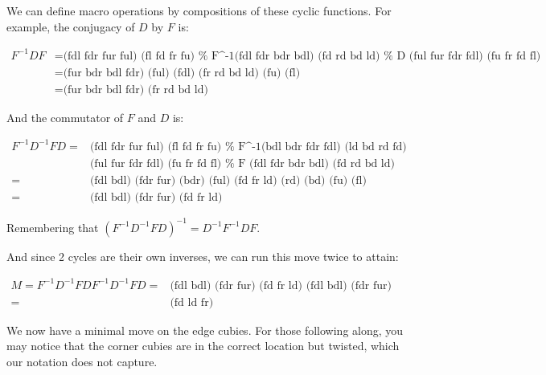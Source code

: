We can define macro operations by compositions of these cyclic
functions.  For example, the conjugacy of $D$ by $F$ is:

\begin{align*}
  F^{-1}DF 
  &= \text{(fdl fdr fur ful) (fl fd fr fu)     %
           (fdl fdr bdr bdl) (fd rd bd ld)     %
           (ful fur fdr fdl) (fu fr fd fl)} \\ %
  &= \text{(fur bdr bdl fdr) (ful) (fdl) (fr rd bd ld) (fu) (fl)} \\
  &= \text{(fur bdr bdl fdr) (fr rd bd ld)}
\end{align*}
  
And the commutator of $F$ and $D$ is:

\begin{align*}
  F^{-1}D^{-1}FD
  = &\text{(fdl fdr fur ful) (fl fd fr fu)     %
           (bdl bdr fdr fdl) (ld bd rd fd)} \\ %
    &\text{(ful fur fdr fdl) (fu fr fd fl)     %
           (fdl fdr bdr bdl) (fd rd bd ld)} \\ %
  = &\text{(fdl bdl) (fdr fur) (bdr) (ful) (fd fr ld) (rd) (bd) (fu) (fl)} \\
  = &\text{(fdl bdl) (fdr fur) (fd fr ld)}
\end{align*}
  
Remembering that $(F^{-1}D^{-1}FD)^{-1} = D^{-1}F^{-1}DF$.

And since 2 cycles are their own inverses, we can run this move twice to attain:

\begin{align*}
  M = F^{-1}D^{-1}FDF^{-1}D^{-1}FD 
  = &\text{(fdl bdl) (fdr fur) (fd fr ld) (fdl bdl) (fdr fur) (fd fr ld)} \\
  = &\text{(fd ld fr)}
\end{align*}

We now have a minimal move on the edge cubies.  For those following
along, you may notice that the corner cubies are in the correct
location but twisted, which our notation does not capture.


